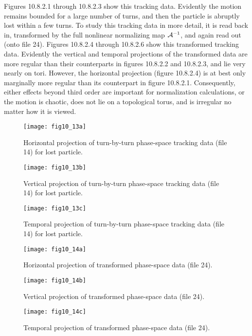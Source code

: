 Figures 10.8.2.1 through 10.8.2.3 show this tracking data.  Evidently the motion
remains bounded for a large number of turns, and then the particle is
abruptly lost within a few turns.  To study this tracking data in more
detail, it is read back in, transformed by the full nonlinear normalizing
map ${\cal A}^{-1}$, and again read out (onto file 24).    Figures 10.8.2.4
through 10.8.2.6 show this transformed tracking data.  Evidently the vertical
and temporal projections of the transformed data are more regular than
their counterparts in figures 10.8.2.2 and 10.8.2.3, and lie very nearly on tori.
However, the horizontal projection (figure 10.8.2.4) is at best only marginally more
regular than its counterpart in figure 10.8.2.1. Consequently, either effects
beyond third order are important for normalization calculations, or the
motion is chaotic, does not lie on a topological torus, and is irregular
no matter how it is viewed.

\newpage
\begin{figure}[htbp]
\setcounter{figure}{0}
  \centering
  \texttt{[image: fig10\_13a]}
  \caption{Horizontal projection of turn-by-turn phase-space tracking data
(file 14) for lost particle.}
\end{figure}

\newpage
\begin{figure}[htbp]
  \centering
  \texttt{[image: fig10\_13b]}
  \caption{Vertical projection of turn-by-turn phase-space tracking data
(file 14) for lost particle.}
\end{figure}

\newpage
\begin{figure}[htbp]
  \centering
  \texttt{[image: fig10\_13c]}
  \caption{Temporal projection of turn-by-turn phase-space tracking data
(file 14) for lost particle.}
\end{figure}

\newpage
\begin{figure}[htbp]
  \centering
  \texttt{[image: fig10\_14a]}
  \caption{Horizontal projection of transformed phase-space data (file 24).}
\end{figure}

\newpage
\begin{figure}[htbp]
  \centering
  \texttt{[image: fig10\_14b]}
  \caption{Vertical projection of transformed phase-space data (file 24).}
\end{figure}

\newpage
\begin{figure}[htbp]
  \centering
  \texttt{[image: fig10\_14c]}
  \caption{Temporal projection of transformed phase-space data (file 24).}
\end{figure}

